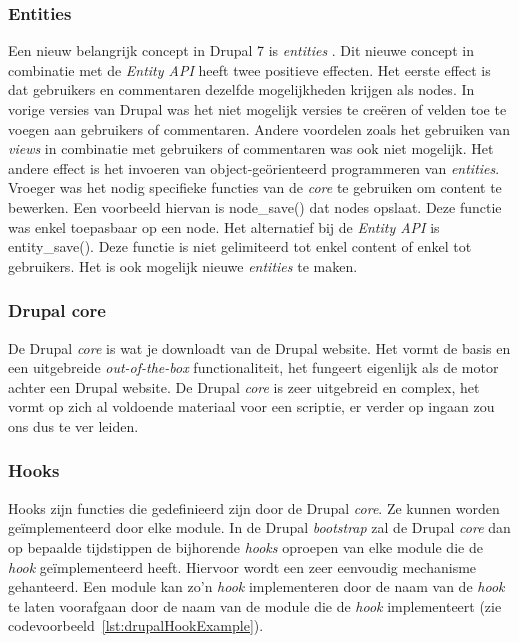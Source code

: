 \subsubsection{Entities}
Een nieuw belangrijk concept in Drupal 7 is \textit{entities} \cite{entities}. Dit nieuwe concept in combinatie met de \textit{Entity API} heeft twee positieve effecten. Het eerste effect is dat gebruikers en commentaren dezelfde mogelijkheden krijgen als nodes. In vorige versies van Drupal was het niet mogelijk versies te cre\"{e}ren of velden toe te voegen aan gebruikers of commentaren. Andere voordelen zoals het gebruiken van \textit{views} in combinatie met gebruikers of commentaren was ook niet mogelijk. Het andere effect is het invoeren van object-ge\"{o}rienteerd programmeren van \textit{entities}. Vroeger was het nodig specifieke functies van de \textit{core} te gebruiken om content te bewerken. Een voorbeeld hiervan is node\_save() dat nodes opslaat. Deze functie was enkel toepasbaar op een node. Het alternatief bij de \textit{Entity API} is entity\_save(). Deze functie is niet gelimiteerd tot enkel content of enkel tot gebruikers.
Het is ook mogelijk nieuwe \textit{entities} te maken. %

\subsubsection{Drupal core}
De Drupal \textit{core} is wat je downloadt van de Drupal website. Het vormt de basis en een uitgebreide \textit{out-of-the-box} functionaliteit, het fungeert eigenlijk als de motor achter een Drupal website. De Drupal \textit{core} is zeer uitgebreid en complex, het vormt op zich al voldoende materiaal voor een scriptie, er verder op ingaan zou ons dus te ver leiden.

\subsubsection{Hooks}
Hooks zijn functies die gedefinieerd zijn door de Drupal \textit{core}. Ze kunnen worden ge\"{i}mplementeerd door elke module. In de Drupal \textit{bootstrap} zal de Drupal \textit{core} dan op bepaalde tijdstippen de bijhorende \textit{hooks} oproepen van elke module die de \textit{hook} ge\"{i}mplementeerd heeft. Hiervoor wordt een zeer eenvoudig mechanisme gehanteerd. Een module kan zo'n \textit{hook} implementeren door de naam van de \textit{hook} te laten voorafgaan door de naam van de module die de \textit{hook} implementeert (zie codevoorbeeld~\ref{lst:drupalHookExample}).\\

